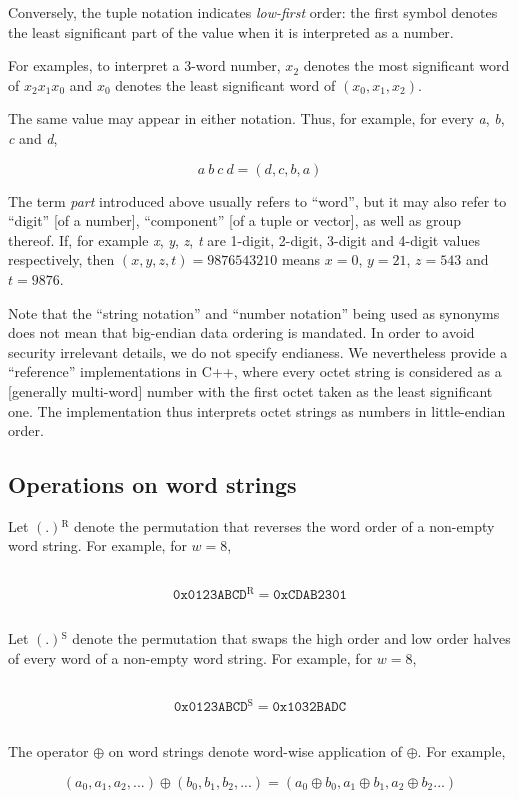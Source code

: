 \documentclass[a4paper,oneside,english]{amsart}
\numberwithin{equation}{section}
\numberwithin{figure}{section}
\begin{document}
Conversely, the tuple notation indicates \emph{low-first} order: the
first symbol denotes the least significant part of the value when
it is interpreted as a number.

For examples, to interpret a 3-word number, $x_{2}$ denotes the most
significant word of $x_{2}x_{1}x_{0}$ and $x_{0}$ denotes the least
significant word of $(x_{0},x_{1},x_{2})$.

The same value may appear in either notation. Thus, for example, for
every \emph{a}, \emph{b}, \emph{c} and \emph{d},

\[
a\: b\: c\: d=(d,c,b,a)
\]


The term \emph{part} introduced above usually refers to {}``word'',
but it may also refer to {}``digit'' {[}of a number{]}, {}``component''
{[}of a tuple or vector{]}, as well as group thereof. If, for example
\emph{x}, \emph{y}, \emph{z}, \emph{t} are 1-digit, 2-digit, 3-digit
and 4-digit values respectively, then $(x,y,z,t)=9876543210$ means
$x=0$, $y=21$, $z=543$ and $t=9876$.

Note that the {}``string notation'' and {}``number notation''
being used as synonyms does not mean that big-endian data ordering
is mandated. In order to avoid security irrelevant details, we do
not specify endianess. We nevertheless provide a {}``reference''
implementations in C++, where every octet string is considered as
a {[}generally multi-word{]} number with the first octet taken as
the least significant one. The implementation thus interprets octet
strings as numbers in little-endian order.


\subsection{Operations on word strings}

Let $(.)\mathrm{^{R}}$ denote the permutation that reverses the word
order of a non-empty word string. For example, for $w=8$, 

\texttt{
\[
\mathtt{0x0123ABCD}\mathrm{^{R}}=\mathtt{0xCDAB2301}
\]
}

Let $(.)\mathrm{^{S}}$ denote the permutation that swaps the high
order and low order halves of every word of a non-empty word string.
For example, for $w=8$, 

\texttt{
\[
\mathtt{0x0123ABCD}\mathrm{^{S}}=\mathtt{0x1032BADC}
\]
}

The operator $\oplus$ on word strings denote word-wise application
of $\oplus$. For example, 

\[
(a_{0},a_{1},a_{2},...)\oplus(b_{0},b_{1},b_{2},...)=(a_{0}\oplus b_{0},a_{1}\oplus b_{1},a_{2}\oplus b_{2}...)
\]
\end{document}
